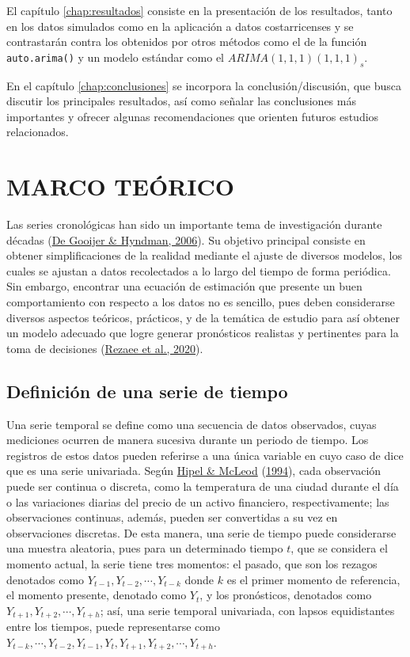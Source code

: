 \documentclass[
]{article}
\begin{document}
El capítulo \ref{chap:resultados} consiste en la presentación de los
resultados, tanto en los datos simulados como en la aplicación a datos
costarricenses y se contrastarán contra los obtenidos por otros métodos
como el de la función \texttt{auto.arima()} y un modelo estándar como el
\(ARIMA(1,1,1)(1,1,1)_s\).

En el capítulo \ref{chap:conclusiones} se incorpora la
conclusión/discusión, que busca discutir los principales resultados, así
como señalar las conclusiones más importantes y ofrecer algunas
recomendaciones que orienten futuros estudios relacionados.

\newpage

\section{MARCO TEÓRICO}


\label{chap:marco_teorico}

Las series cronológicas han sido un importante tema de investigación
durante décadas (\protect\hyperlink{ref-tsa_decades}{De Gooijer \&
Hyndman, 2006}). Su objetivo principal consiste en obtener
simplificaciones de la realidad mediante el ajuste de diversos modelos,
los cuales se ajustan a datos recolectados a lo largo del tiempo de
forma periódica. Sin embargo, encontrar una ecuación de estimación que
presente un buen comportamiento con respecto a los datos no es sencillo,
pues deben considerarse diversos aspectos teóricos, prácticos, y de la
temática de estudio para así obtener un modelo adecuado que logre
generar pronósticos realistas y pertinentes para la toma de decisiones
(\protect\hyperlink{ref-tsa_decision_making}{Rezaee et al., 2020}).

\subsection{Definición de una serie de tiempo}

Una serie temporal se define como una secuencia de datos observados,
cuyas mediciones ocurren de manera sucesiva durante un periodo de
tiempo. Los registros de estos datos pueden referirse a una única
variable en cuyo caso de dice que es una serie univariada. Según
\protect\hyperlink{ref-Hipel}{Hipel \& McLeod}
(\protect\hyperlink{ref-Hipel}{1994}), cada observación puede ser
continua o discreta, como la temperatura de una ciudad durante el día o
las variaciones diarias del precio de un activo financiero,
respectivamente; las observaciones continuas, además, pueden ser
convertidas a su vez en observaciones discretas. De esta manera, una
serie de tiempo puede considerarse una muestra aleatoria, pues para un
determinado tiempo \(t\), que se considera el momento actual, la serie
tiene tres momentos: el pasado, que son los rezagos denotados como
\(Y_{t-1}, Y_{t-2}, \cdots, Y_{t-k}\) donde \(k\) es el primer momento
de referencia, el momento presente, denotado como \(Y_t\), y los
pronósticos, denotados como \(Y_{t+1}, Y_{t+2}, \cdots, Y_{t+h}\); así,
una serie temporal univariada, con lapsos equidistantes entre los
tiempos, puede representarse como
\(Y_{t-k}, \cdots, Y_{t-2}, Y_{t-1}, Y_t, Y_{t+1}, Y_{t+2}, \cdots, Y_{t+h}\).
\end{document}
